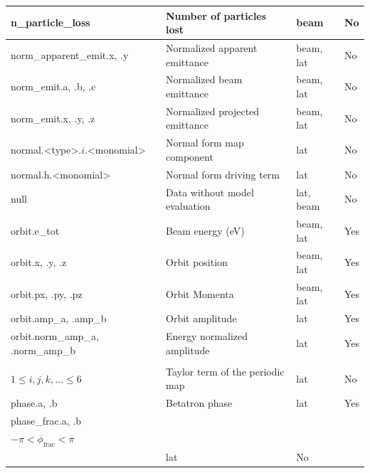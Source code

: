 {\begin{longtable}{llll}
  n_particle_loss                     & Number of particles lost                  & beam        & No  \\ \hline 
  norm_apparent_emit.x, .y            & Normalized apparent emittance             & beam, lat   & No  \\ \hline
  norm_emit.a, .b, .c                 & Normalized beam emittance                 & beam, lat   & No  \\ \hline 
  norm_emit.x, .y, .z                 & Normalized projected emittance            & beam, lat   & No  \\ \hline 
  normal.<type>.$i$.<monomial>        & Normal form map component                 & lat         & No  \\ \hline
  normal.h.<monomial>                 & Normal form driving term                  & lat         & No  \\ \hline
  null                                & Data without model evaluation             & lat, beam   & No  \\ \hline
  orbit.e_tot                         & Beam energy (eV)                          & beam, lat   & Yes \\ \hline
  orbit.x, .y, .z                     & Orbit position                            & beam, lat   & Yes \\ \hline 
  orbit.px, .py, .pz                  & Orbit Momenta                             & beam, lat   & Yes \\ \hline 
  orbit.amp_a, .amp_b                 & Orbit amplitude                           & lat         & Yes \\ \hline 
  orbit.norm_amp_a, .norm_amp_b       & Energy normalized amplitude               & lat         & Yes \\ \hline 

  \begin{tabular}{@{}l}
    periodic.tt.$ijklm\ldots$ \\
    $1 \le i,j,k,\ldots \le 6$   
  \end{tabular}
                                      & Taylor term of the periodic map           & lat         & No  \\ \hline 

  phase.a, .b                         & Betatron phase                            & lat         & Yes \\ \hline 
  phase_frac.a, .b                    & \begin{tabular}{@{}l}
                                         Fractional betatron phase \\       
                                         $-\pi < \phi_{\mbox{frac}} < \pi$ \\
                                       \end{tabular}                              & lat         & No  \\ \hline 


\end{longtable}}
